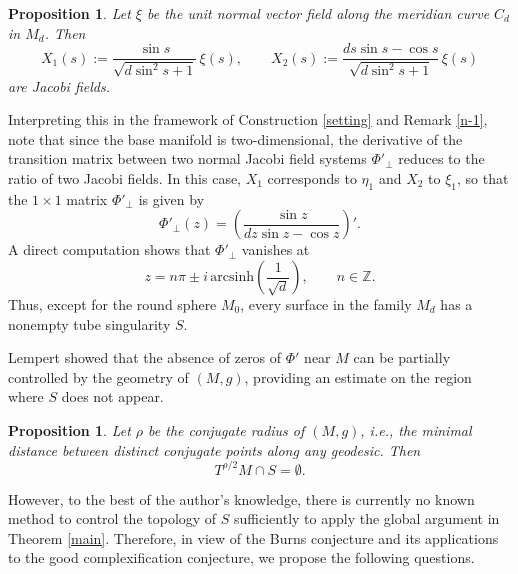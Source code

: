 \documentclass[a4paper, 12pt]{article}
\newcommand{\bZ}{\mathbb{Z}}
\newtheorem{prop}[thm]{Proposition}
\begin{document}
\begin{prop}
Let $\xi$ be the unit normal vector field along the meridian curve $C_d$ in $M_d$. Then
\[
X_1(s) := \frac{\sin s}{\sqrt{d \sin^2 s + 1}} \, \xi(s), \qquad
X_2(s) := \frac{ds \sin s - \cos s}{\sqrt{d \sin^2 s + 1}} \, \xi(s)
\]
are Jacobi fields.
\end{prop}

Interpreting this in the framework of Construction \ref{setting} and Remark \ref{n-1}, note that since the base manifold is two-dimensional, the derivative of the transition matrix between two normal Jacobi field systems $\Phi'_\perp$ reduces to the ratio of two Jacobi fields. In this case, $X_1$ corresponds to $\eta_1$ and $X_2$ to $\xi_1$, so that the $1 \times 1$ matrix $\Phi'_\perp$ is given by
\[
\Phi'_\perp(z) = \left( \frac{\sin z}{dz \sin z - \cos z} \right)'.
\]
A direct computation shows that $\Phi'_\perp$ vanishes at
\[
z = n\pi \pm i \, \mathrm{arcsinh}\!\left(\frac{1}{\sqrt{d}}\right), \qquad n \in \bZ.
\]
Thus, except for the round sphere $M_0$, every surface in the family $M_d$ has a nonempty tube singularity $S$.

Lempert \cite[Proposition 3.1, Lemma 3.1, Lemma 4.1]{L93} showed that the absence of zeros of $\Phi'$ near $M$ can be partially controlled by the geometry of $(M,g)$, providing an estimate on the region where $S$ does not appear.

\begin{prop}
Let $\rho$ be the conjugate radius of $(M,g)$, i.e., the minimal distance between distinct conjugate points along any geodesic. Then
\[
T^{\rho/2}M \cap S = \emptyset.
\]
\end{prop}

However, to the best of the author's knowledge, there is currently no known method to control the topology of $S$ sufficiently to apply the global argument in Theorem \ref{main}. Therefore, in view of the Burns conjecture and its applications to the good complexification conjecture, we propose the following questions.
\end{document}
